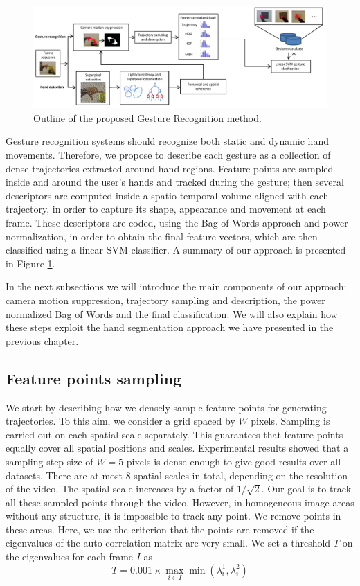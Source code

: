 \begin{figure}
\centering
\includegraphics[width=\linewidth]{Figures/schema.pdf}
\caption{Outline of the proposed Gesture Recognition method.}
\label{schema}
\end{figure}
Gesture recognition systems should recognize both static and dynamic hand movements. Therefore, we propose to describe each gesture as a collection of dense trajectories extracted around hand regions. Feature points are sampled inside and around the user's hands and tracked during the gesture; then several descriptors are computed inside a spatio-temporal volume aligned with each trajectory, in order to capture its shape, appearance and movement at each frame. 
These descriptors are coded,  using the Bag of Words approach and power normalization, in order to obtain the final feature vectors, which are then classified using a linear SVM classifier. A summary of our approach is presented in Figure \ref{schema}.

In the next subsections we will introduce the main components of our approach: camera motion suppression, trajectory sampling and description, the power normalized Bag of Words and the final classification. We will also explain how these steps exploit the hand segmentation approach we have presented in the previous chapter.

\subsection{Feature points sampling}
We start by describing how we densely sample feature points for generating trajectories. To this aim, we consider a grid spaced by $W$ pixels. Sampling is carried out on each
spatial scale separately. This guarantees that feature points equally cover all spatial
positions and scales. Experimental results showed that a sampling step size of $W = 5$ pixels is dense
enough to give good results over all datasets. There are at most 8 spatial scales in total, depending on the
resolution of the video. The spatial scale increases by a factor of $1/\sqrt{2}$.
Our goal is to track all these sampled points through the video. However, in homogeneous image
areas without any structure, it is impossible to track any point. We remove points in these areas. Here, we
use the criterion that the points are removed if the eigenvalues of the auto-correlation
matrix are very small. We set a threshold $T$ on the eigenvalues for each frame $I$ as
\begin{equation}
T = 0.001 \times \max_{i\in I} \min(\lambda_i^1, \lambda_i^2)
\end{equation}

